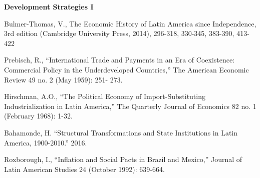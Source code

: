 \documentclass[letterpaper]{article}
\renewenvironment{itemize}{
  \begin{list}{}{
    \setlength{\leftmargin}{1.5em}
  }
}{
  \end{list}
}
\begin{document}
\begin{enumerate}
\item {\bf Development Strategies I}
	\begin{itemize}
		\item[$\bullet$] Bulmer-Thomas, V., The Economic History of Latin America since Independence, 3rd edition (Cambridge University Press, 2014), 296-318, 330-345, 383-390, 413-422
		\item[$\bullet$] Prebisch, R., ``International Trade and Payments in an Era of Coexistence: Commercial Policy in the Underdeveloped Countries,'' The American Economic Review 49 no. 2 (May 1959): 251- 273.
		\item[$\bullet$] Hirschman, A.O., ``The Political Economy of Import-Substituting Industrialization in Latin America,'' The Quarterly Journal of Economics 82 no. 1 (February 1968): 1-32.
		\item[$\bullet$] Bahamonde, H. ``Structural Transformations and State Institutions in Latin America, 1900-2010.'' 2016.
		\item[$\bullet$] Roxborough, I., ``Inflation and Social Pacts in Brazil and Mexico,'' Journal of Latin American Studies 24 (October 1992): 639-664.
	\end{itemize}




\end{enumerate}
\end{document}
